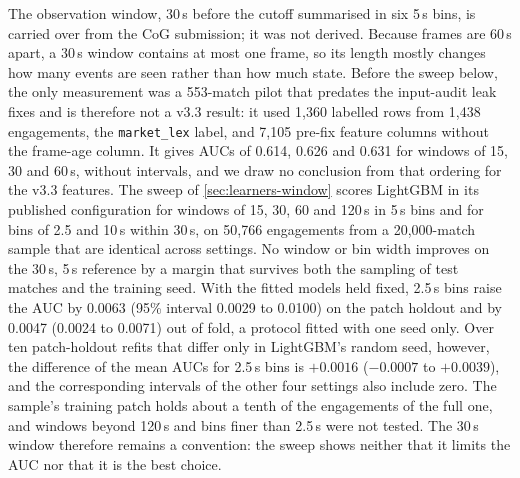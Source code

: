 The observation window, 30\,s before the cutoff summarised in six 5\,s bins, is carried over
from the CoG submission; it was not derived.
Because frames are 60\,s apart, a 30\,s window contains at most one frame, so its length mostly
changes how many events are seen rather than how much state. Before the sweep below, the only
measurement was a 553-match pilot that predates the input-audit leak fixes and is therefore not a v3.3
result: it used 1,360 labelled rows from 1,438 engagements, the \texttt{market\_lex} label, and 7,105
pre-fix feature columns without the frame-age column. It gives AUCs of 0.614, 0.626 and 0.631 for windows of 15, 30
and 60\,s, without intervals, and we draw no conclusion from that ordering for the v3.3 features.
The sweep of \cref{sec:learners-window} scores LightGBM in its published configuration for windows of
15, 30, 60 and 120\,s in 5\,s bins and for bins of 2.5 and 10\,s within 30\,s, on 50,766 engagements
from a 20,000-match sample that are identical across settings. No window or bin width improves on the
30\,s, 5\,s reference by a margin that survives both the sampling of test matches and the training seed.
With the fitted models held fixed, 2.5\,s bins raise the AUC by 0.0063 (95\% interval 0.0029 to 0.0100)
on the patch holdout and by 0.0047 (0.0024 to 0.0071) out of fold, a protocol fitted with one seed only.
Over ten patch-holdout refits that differ only in LightGBM's random seed, however, the difference of the
mean AUCs for 2.5\,s bins is $+0.0016$ ($-0.0007$ to $+0.0039$), and the corresponding intervals of the
other four settings also include zero. The sample's training patch holds about a tenth of the engagements
of the full one, and windows beyond 120\,s and bins finer than 2.5\,s were not tested. The 30\,s window
therefore remains a convention: the sweep shows neither that it limits the AUC nor that it is the best
choice.
